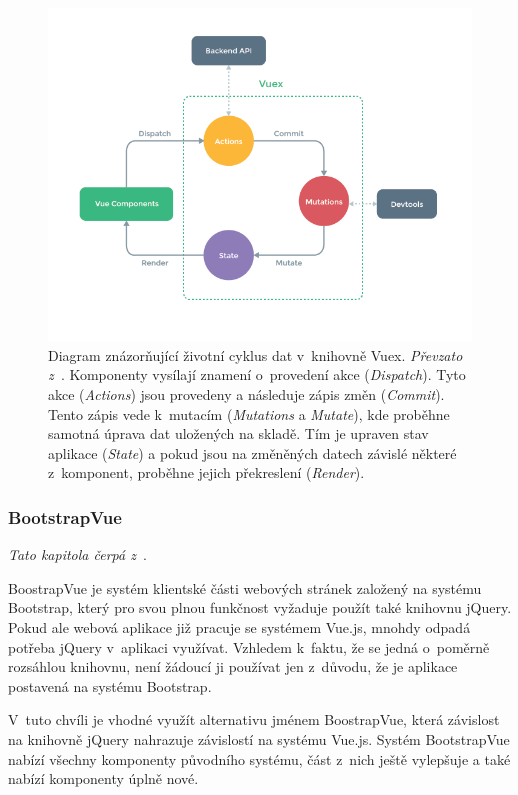 \begin{figure}[H]
	\centering
	\includegraphics[width=\textwidth]{obrazky-figures/vuex.png}
	\caption{Diagram znázorňující životní cyklus dat v~knihovně Vuex. \emph{Převzato z~\cite{bib:vuex-doc}}. Komponenty vysílají znamení o~provedení akce (\emph{Dispatch}). Tyto akce (\emph{Actions}) jsou provedeny a následuje zápis změn (\emph{Commit}). Tento zápis vede k~mutacím (\emph{Mutations} a \emph{Mutate}), kde proběhne samotná úprava dat uložených na skladě. Tím je upraven stav aplikace (\emph{State}) a pokud jsou na změněných datech závislé některé z~komponent, proběhne jejich překreslení (\emph{Render}).}
	\label{img:vuex-dataflow}
\end{figure}



\subsubsection*{BootstrapVue}
\emph{Tato kapitola čerpá z~\cite{bib:bootstrap-vue}}.

BoostrapVue je systém klientské části webových stránek založený na systému Bootstrap, který pro svou plnou funkčnost vyžaduje použít také knihovnu jQuery. Pokud ale webová aplikace již pracuje se systémem Vue.js, mnohdy odpadá potřeba jQuery v~aplikaci využívat. Vzhledem k~faktu, že se jedná o~poměrně rozsáhlou knihovnu, není žádoucí ji používat jen z~důvodu, že je aplikace postavená na systému Bootstrap.

V~tuto chvíli je vhodné využít alternativu jménem BoostrapVue, která závislost na knihovně jQuery nahrazuje závislostí na systému Vue.js. Systém BootstrapVue nabízí všechny komponenty původního systému, část z~nich ještě vylepšuje a také nabízí komponenty úplně nové.

